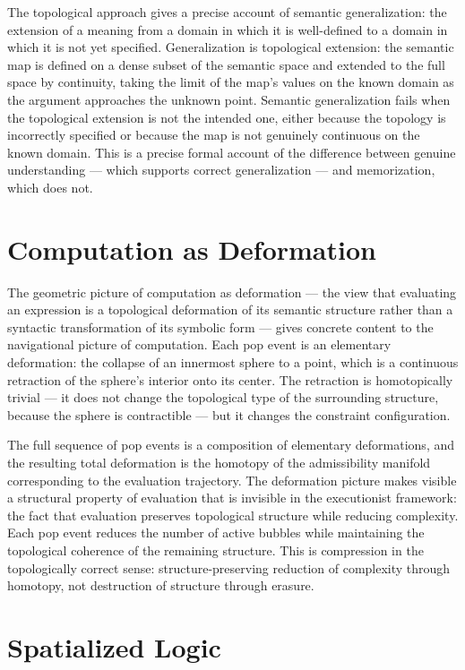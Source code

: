 \documentclass[12pt,openany]{book}
\theoremstyle{plain}
\theoremstyle{definition}
\theoremstyle{remark}
\begin{document}
The topological approach gives a precise account of semantic generalization: the extension of a meaning from a domain in which it is well-defined to a domain in which it is not yet specified. Generalization is topological extension: the semantic map is defined on a dense subset of the semantic space and extended to the full space by continuity, taking the limit of the map's values on the known domain as the argument approaches the unknown point. Semantic generalization fails when the topological extension is not the intended one, either because the topology is incorrectly specified or because the map is not genuinely continuous on the known domain. This is a precise formal account of the difference between genuine understanding — which supports correct generalization — and memorization, which does not.

\section{Computation as Deformation}

The geometric picture of computation as deformation — the view that evaluating an expression is a topological deformation of its semantic structure rather than a syntactic transformation of its symbolic form — gives concrete content to the navigational picture of computation. Each pop event is an elementary deformation: the collapse of an innermost sphere to a point, which is a continuous retraction of the sphere's interior onto its center. The retraction is homotopically trivial — it does not change the topological type of the surrounding structure, because the sphere is contractible — but it changes the constraint configuration.

The full sequence of pop events is a composition of elementary deformations, and the resulting total deformation is the homotopy of the admissibility manifold corresponding to the evaluation trajectory. The deformation picture makes visible a structural property of evaluation that is invisible in the executionist framework: the fact that evaluation preserves topological structure while reducing complexity. Each pop event reduces the number of active bubbles while maintaining the topological coherence of the remaining structure. This is compression in the topologically correct sense: structure-preserving reduction of complexity through homotopy, not destruction of structure through erasure.

\section{Spatialized Logic}
\end{document}
